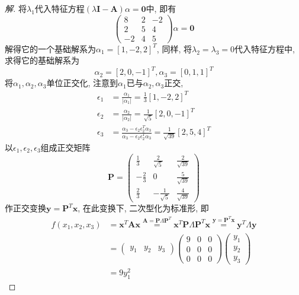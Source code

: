 \documentclass[10pt,a4paper]{report}
\def\*#1{\mathbf{#1}}
\begin{document}
\begin{proof}[解]
	将$\lambda_1$代入特征方程$(\lambda\*I - \*A)\alpha = \*0$中, 即有
	\[\begin{pmatrix}
	8 & 2 & -2 \\
	2 & 5 & 4 \\
	-2 & 4 & 5
	\end{pmatrix}\alpha = \*0 \]
	解得它的一个基础解系为$\alpha_1 = [1, -2, 2]^T$, 同样, 将$\lambda_2 = \lambda_3 = 0$代入特征方程中, 求得它的基础解系为
	\[\alpha_2 = [2, 0, -1]^T, \alpha_3 = [0, 1, 1]^T\]
	将$\alpha_1, \alpha_2, \alpha_3$单位正交化, 注意到$\alpha_1$已与$\alpha_2, \alpha_3$正交,  
	\begin{align*}
	\epsilon_1 &= \frac{\alpha_1}{|\alpha_1|} = \frac{1}{3} [1, -2, 2]^T \\
	\epsilon_2 &= \frac{\alpha_2}{|\alpha_2|} = \frac{1}{\sqrt{5}} [2, 0, -1]^T \\
	\epsilon_3 &= \frac{\alpha_3 - \epsilon_2\epsilon_2^T\alpha_3}{\alpha_3 - \epsilon_2\epsilon_2^T\alpha_3} = \frac{1}{\sqrt{39}} [2, 5, 4]^T
	\end{align*}
	以$\epsilon_1, \epsilon_2, \epsilon_3$组成正交矩阵 
	\[\*P = \begin{pmatrix}
	\frac{1}{3} & \frac{2}{\sqrt{5}} & \frac{2}{\sqrt{39}} \\
	-\frac{2}{3} & 0 & \frac{5}{\sqrt{39}} \\
	\frac{2}{3} & -\frac{1}{\sqrt{5}} & \frac{4}{\sqrt{39}}
	\end{pmatrix}\]
	作正交变换$\*y = \*P^T\*x$, 在此变换下, 二次型化为标准形, 即
	\begin{align*}
	f(x_1, x_2, x_3) &= \*x^T\*A\*x \stackrel{\*A = \*P\Lambda\*P^T}{=} \*x^T\*P\Lambda \*P^T \*x \stackrel{\*y = \*P^T\*x}{=} \*y^T\Lambda \*y \\
	&= \begin{pmatrix}
	y_1 & y_2 & y_3
	\end{pmatrix} \begin{pmatrix}
	9 & 0 & 0 \\
	0 & 0 & 0 \\
	0 & 0 & 0
	\end{pmatrix}\begin{pmatrix}
	y_1 \\
	y_2 \\
	y_3
	\end{pmatrix} \\
	&= 9y_1^2
	\end{align*}
\end{proof}
\end{document}
